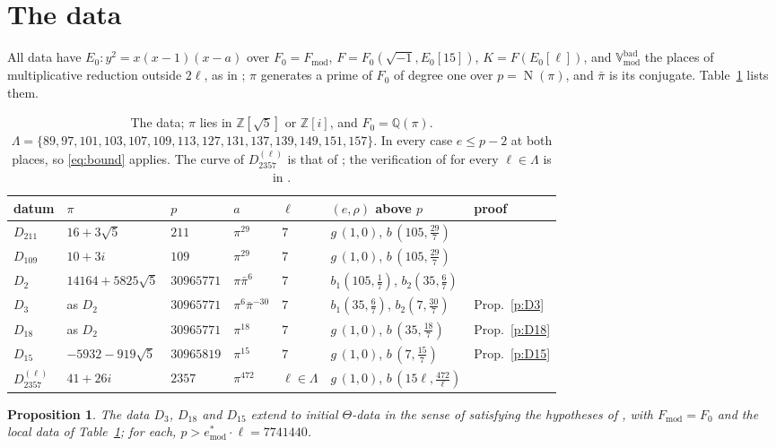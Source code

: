 \documentclass[11pt]{amsart}
\newtheorem{proposition}[theorem]{Proposition}
\theoremstyle{remark}
\newcommand{\Q}{\mathbb Q}
\newcommand{\Z}{\mathbb Z}
\newcommand{\Fmod}{F_{\mathrm{mod}}}
\newcommand{\Vbadmod}{\mathbb V^{\mathrm{bad}}_{\mathrm{mod}}}
\newcommand{\Nm}{\operatorname{N}}
\begin{document}
\section{The data}\label{s:data}

All data have $E_0\colon y^2=x(x-1)(x-a)$ over $F_0=\Fmod$, $F=F_0(\sqrt{-1},E_0[15])$, $K=F(E_0[\ell])$, and
$\Vbadmod$ the places of multiplicative reduction outside $2\ell$, as in \cite[\S2]{Note}; $\pi$ generates a prime of
$F_0$ of degree one over $p=\Nm(\pi)$, and $\bar\pi$ is its conjugate. Table~\ref{tab:data} lists them.

\begin{table}[ht]
\centering\footnotesize\setlength{\tabcolsep}{3pt}
\begin{tabular}{@{}lllllll@{}}
\toprule
datum & $\pi$ & $p$ & $a$ & $\ell$ & $(e,\rho)$ above $p$ & proof\\
\midrule
$D_{211}$ & $16+3\sqrt5$ & $211$ & $\pi^{29}$ & $7$ & $g\,(1,0)$, $b\,(105,\tfrac{29}7)$ & \cite[Thm.~1]{First}\\
$D_{109}$ & $10+3i$ & $109$ & $\pi^{29}$ & $7$ & $g\,(1,0)$, $b\,(105,\tfrac{29}7)$ & \cite{Second}\\
$D_2$ & $14164+5825\sqrt5$ & $30965771$ & $\pi\bar\pi^{6}$ & $7$ & $b_1(105,\tfrac17)$, $b_2(35,\tfrac67)$ & \cite[Prop.~2]{Note}\\
$D_3$ & as $D_2$ & $30965771$ & $\pi^{6}\bar\pi^{-30}$ & $7$ & $b_1(35,\tfrac67)$, $b_2(7,\tfrac{30}7)$ & Prop.~\ref{p:D3}\\
$D_{18}$ & as $D_2$ & $30965771$ & $\pi^{18}$ & $7$ & $g\,(1,0)$, $b\,(35,\tfrac{18}7)$ & Prop.~\ref{p:D18}\\
$D_{15}$ & $-5932-919\sqrt5$ & $30965819$ & $\pi^{15}$ & $7$ & $g\,(1,0)$, $b\,(7,\tfrac{15}7)$ & Prop.~\ref{p:D15}\\
$D_{2357}^{(\ell)}$ & $41+26i$ & $2357$ & $\pi^{472}$ & $\ell\in\Lambda$ & $g\,(1,0)$, $b\,(15\ell,\tfrac{472}\ell)$ & \cite{Fourteen}\\
\bottomrule
\end{tabular}
\caption{The data; $\pi$ lies in $\Z[\sqrt5]$ or $\Z[i]$, and $F_0=\Q(\pi)$. $\Lambda=\{89,97,101,103,107,109,113,127,131,137,139,149,151,157\}$. In every case $e\le p-2$ at
both places, so \eqref{eq:bound} applies. The curve of $D_{2357}^{(\ell)}$ is that of \cite[\S13]{Second}; the
verification of \cite[Def.~3.1]{IUT1} for every $\ell\in\Lambda$ is in \cite{Fourteen}.}\label{tab:data}
\end{table}

\begin{proposition}\label{p:new}
The data $D_3$, $D_{18}$ and $D_{15}$ extend to initial $\Theta$-data in the sense of \cite[Def.~3.1]{IUT1} satisfying
the hypotheses of \cite[Thm.~1.10]{IUT4}, with $\Fmod=F_0$ and the local data of Table~\ref{tab:data}; for each,
$p>e^*_{\mathrm{mod}}\cdot\ell=7741440$.
\end{proposition}
\end{document}
